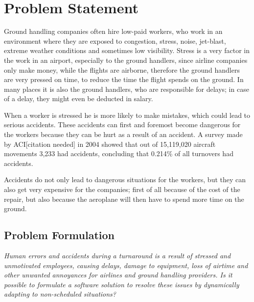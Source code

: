\chapter{Problem Statement}

Ground handling companies often hire low-paid workers, who work in an environment where they are exposed to congestion, stress, noise, jet-blast, extreme weather conditions and sometimes low visibility. Stress is a very factor in the work in an airport, especially to the ground handlers, since airline companies only make money, while the flights are airborne, therefore the ground handlers are very pressed on time, to reduce the time the flight spends on the ground. In many places it is also the ground handlers, who are responsible for delays; in case of a delay, they might even be deducted in salary.

When a worker is stressed he is more likely to make mistakes, which could lead to serious accidents. These accidents can first and foremost become dangerous for the workers because they can be hurt as a result of an accident. A survey made by ACI[citation needed] in 2004 showed that out of 15,119,020 aircraft movements 3,233 had accidents, concluding that 0.214\% of all turnovers had accidents.

Accidents do not only lead to dangerous situations for the workers, but they can also get very expensive for the companies; first of all because of the cost of the repair, but also because the aeroplane will then have to spend more time on the ground.
\section{Problem Formulation}
\begin{center}
\textit{Human errors and accidents during a turnaround is a result of stressed and unmotivated employees, causing delays, damage to equipment, loss of airtime and other unwanted annoyances for airlines and ground handling providers. Is it possible to formulate a software solution to resolve these issues by dynamically adapting to non-scheduled situations?}
\end{center}
